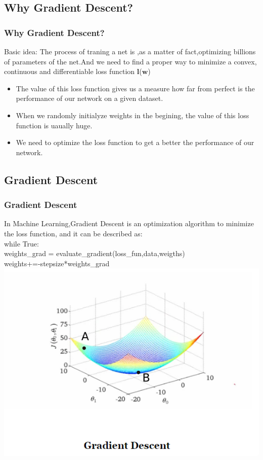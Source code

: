 \documentclass[cjk]{beamer}
\begin{document}
\begin{CJK*}{GBK}{kai}
\subsection{Why Gradient Descent?}
\begin{frame}
\frametitle{Why Gradient Descent?}
\begin{block}{Basic idea:}
	The process of traning a net is ,as a matter of fact,optimizing billions of parameters of the net.And we need to find a proper way to
	 minimize a convex, continuous and differentiable loss function $\mathbf{l}$($\mathbf{w}$)
\end{block}
\begin{itemize}
	\item The value of this loss function gives us a measure how far from perfect is the performance of our network on a given dataset.
	\item When we randomly initialyze weights in the begining, the value of this loss function is uaually huge.
	\item We need to optimize the loss function to get a better the performance of our network.
\end{itemize}
\end{frame}

\subsection{Gradient Descent}
\begin{frame}
\frametitle{Gradient Descent}
In Machine Learning,Gradient Descent is an optimization algorithm to minimize the loss function,
and it can be described as:\\
while True:\\
weights\_grad = evaluate\_gradient(loss\_fun,data,weigths)\\
weights+=-stepsize*weights\_grad
\includegraphics[width =.9 \textwidth,height=.48\textheight]{GD.png}
\end{frame}


\end{CJK*}
\end{document}
